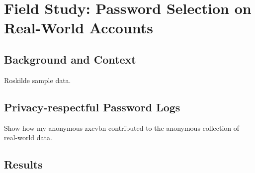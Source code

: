 
\chapter[Field Study: Password Selection on Real-World Accounts]{Field Study: Password Selection on Real-World Accounts}\label{sec:roskilde_pw}

 \section{Background and Context}

Roskilde sample data.

\section{Privacy-respectful Password Logs}
Show how my anonymous zxcvbn contributed to the anonymous collection of real-world data.

\section{Results}
